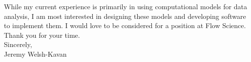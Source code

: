 \documentclass[]{letter}
\begin{document}
While my current experience is primarily in using computational models for data analysis, I am most interested in designing these models and developing software to implement them. I would love to be considered for a position at Flow Science. Thank you for your time. \\

Sincerely, \\
Jeremy Welsh-Kavan
\end{document}
